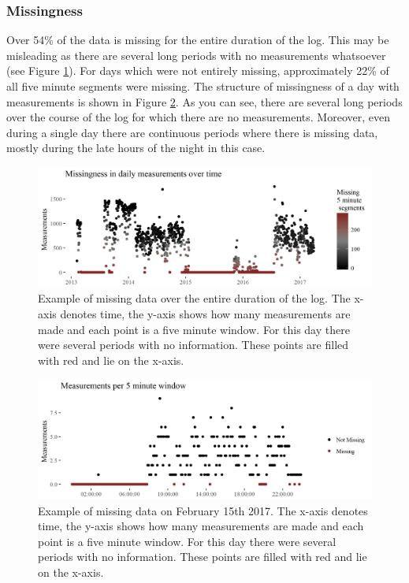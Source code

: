 \documentclass[english,man]{apa6}
\theoremstyle{definition}
\theoremstyle{definition}
\theoremstyle{definition}
\theoremstyle{remark}
\begin{document}
\subsubsection{Missingness}\label{missingness}

Over 54\% of the data is missing for the entire duration of the log.
This may be misleading as there are several long periods with no
measurements whatsoever (see Figure \ref{fig:longMeasurementsPerDay}).
For days which were not entirely missing, approximately 22\% of all five
minute segments were missing. The structure of missingness of a day with
measurements is shown in Figure \ref{fig:measurementsPerDay}. As you can
see, there are several long periods over the course of the log for which
there are no measurements. Moreover, even during a single day there are
continuous periods where there is missing data, mostly during the late
hours of the night in this case.

\begin{figure}
\includegraphics[width=1\linewidth]{img/missingdayBoaz5min} \caption{Example of missing data over the entire duration of the log. The x-axis denotes time, the y-axis shows how many measurements are made and each point is a five minute window. For this day there were several periods with no information. These points are filled with red and lie on the x-axis.}\label{fig:longMeasurementsPerDay}
\end{figure}

\begin{figure}
\includegraphics[width=1\linewidth]{img/missingBoaz5minExample} \caption{Example of missing data on February 15th 2017. The x-axis denotes time, the y-axis shows how many measurements are made and each point is a five minute window. For this day there were several periods with no information. These points are filled with red and lie on the x-axis.}\label{fig:measurementsPerDay}
\end{figure}
\end{document}
